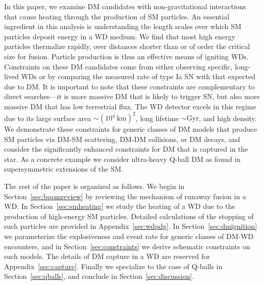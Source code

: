 In this paper, we examine DM candidates with non-gravitational interactions that cause heating through the production of SM particles.
An essential ingredient in this analysis is understanding the length scales over which SM particles deposit energy in a WD medium.
We find that most high energy particles thermalize rapidly, over distances shorter than or of order the critical size for fusion. 
Particle production is thus an effective means of igniting WDs. 
Constraints on these DM candidates come from either observing specific, long-lived WDs or by comparing the measured rate of type Ia SN with that expected due to DM.
It is important to note that these constraints are complementary to direct searches---it is more massive DM that is likely to trigger SN, but also more massive DM that has low terrestrial flux.
The WD detector excels in this regime due to its large surface area $\sim (10^4~\text{km})^2$, long lifetime $\sim \text{Gyr}$, and high density. 
We demonstrate these constraints for generic classes of DM models that produce SM particles via DM-SM scattering, DM-DM collisions, or DM decays, and consider the significantly enhanced constraints for DM that is captured in the star.
As a concrete example we consider ultra-heavy Q-ball DM as found in supersymmetric extensions of the SM. 

The rest of the paper is organized as follows.
We begin in Section~\ref{sec:boomreview} by reviewing the mechanism of runaway fusion in a WD.
In Section~\ref{sec:smheating} we study the heating of a WD due to the production of high-energy SM particles.
Detailed calculations of the stopping of such particles are provided in Appendix~\ref{sec:wdpdg}.
In Section~\ref{sec:dmignition} we parameterize the explosiveness and event rate for generic classes of DM-WD encounters, and in Section~\ref{sec:constraints} we derive schematic constraints on such models.
The details of DM capture in a WD are reserved for Appendix~\ref{sec:capture}.
Finally we specialize to the case of Q-balls in Section~\ref{sec:qballs}, and conclude in Section~\ref{sec:discussion}.